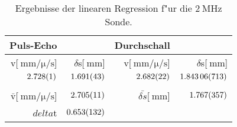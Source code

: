 \begin{table}[!h]
\begin{center}
\begin{tabular}{|r|r|r|r|}
\hline
Puls-Echo & & Durchschall & \\
\hline
\hline
v[$\SI{}{\milli\meter\per\micro\per\second}$] & $\delta$s[$\SI{}{\milli\meter}$] & v[$\SI{}{\milli\meter\per\micro\per\second}$]& $\delta$s[$\SI{}{\milli\meter}$]\\
\hline
$\SI{2.728 (1)}{}$ & $\SI{1.691 (43)}{}$ & $\SI{2.682 (22)}{}$ & $\SI{1.84306 (713)}{}$\\
\hline
\hline
&&&\\
$\bar{\mathrm{v}}$[$\SI{}{\milli\meter\per\micro\per\second}$] & $\SI{2.705 (11)}{}$ & $\bar{\delta s}$[$\SI{}{\milli\meter}$] & $\SI{1.767 (357)}{}$\\
\hline
$delta$t & $\SI{0.653 (132)}{}$ &&\\
\hline
\end{tabular}
\caption[]{Ergebnisse der linearen Regression f"ur die $\SI{2}{\mega\hertz}$ Sonde.}
\label{r2}
\end{center}
\end{table}